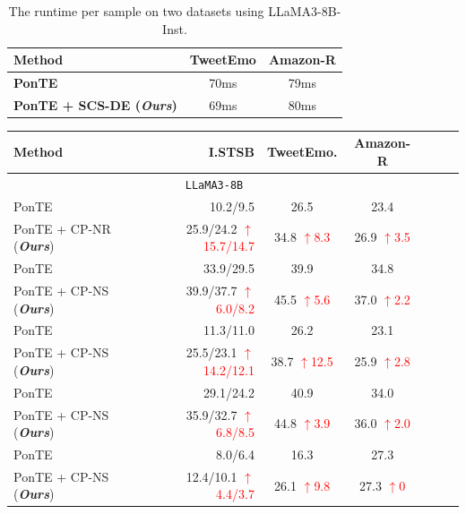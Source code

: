 \documentclass[11pt]{article}
\newcommand{\up}[1]{\textcolor{red}{{$\uparrow$#1}}}
\begin{document}
\begin{table}[t] \small
    \centering
    \setlength{\tabcolsep}{6pt}
    \begin{tabular}{lcc}
        \toprule
        \textbf{Method} & \textbf{TweetEmo} & \textbf{Amazon-R}\\
        \midrule
        \textbf{PonTE}  & 70ms   & 79ms \\
        \textbf{PonTE + SCS-DE (\textbf{\textit{Ours}})} & 69ms &  80ms\\
        \bottomrule
    \end{tabular}
    \caption{The runtime per sample on two datasets using LLaMA3-8B-Inst.}
    \label{tab:time}
\end{table}

\iffalse
\begin{table}[t] \small
\centering
\begin{tabular}{lrccccc}
\toprule
\textbf{Method}  & \textbf{I.STSB} & \textbf{TweetEmo.} & \textbf{Amazon-R} \\
\midrule
\multicolumn{4}{c}{\texttt{LLaMA3-8B}}\\
\midrule
PonTE & 10.2/9.5 &26.5 &23.4  \\
PonTE + CP-NR (\textbf{\textit{Ours}})&  \cellcolor{tabcolor3} 25.9/24.2 \up{15.7/14.7} & \cellcolor{tabcolor3} 34.8 \up{8.3} &26.9 \up{3.5} \cellcolor{tabcolor3} &  \\
\midrule
PonTE & 33.9/29.5 &39.9 &34.8 \\
PonTE + CP-NS (\textbf{\textit{Ours}}) &  \cellcolor{tabcolor3} 39.9/37.7 \up{6.0/8.2} & \cellcolor{tabcolor3} 45.5 \up{5.6} & \cellcolor{tabcolor3} 37.0 \up{2.2} \\
\midrule
PonTE & 11.3/11.0 &26.2 &23.1 \\
PonTE + CP-NS (\textbf{\textit{Ours}}) & \cellcolor{tabcolor3} 25.5/23.1 \up{14.2/12.1} & \cellcolor{tabcolor3} 38.7 \up{12.5} &25.9 \up{2.8} \cellcolor{tabcolor3} \\
\midrule
PonTE & 29.1/24.2 &40.9  &34.0 \\
PonTE + CP-NS (\textbf{\textit{Ours}}) &  \cellcolor{tabcolor3} 35.9/32.7 \up{6.8/8.5} & \cellcolor{tabcolor3} 44.8 \up{3.9} &36.0 \up{2.0} \cellcolor{tabcolor3}\\
\midrule
PonTE & 8.0/6.4 &16.3 &27.3   \\
PonTE + CP-NS (\textbf{\textit{Ours}}) &  \cellcolor{tabcolor3} 12.4/10.1 \up{4.4/3.7} & \cellcolor{tabcolor3} 26.1 \up{9.8} &27.3 \up{0} \cellcolor{tabcolor3}  \\

\end{tabular}
\end{table}
\end{document}
